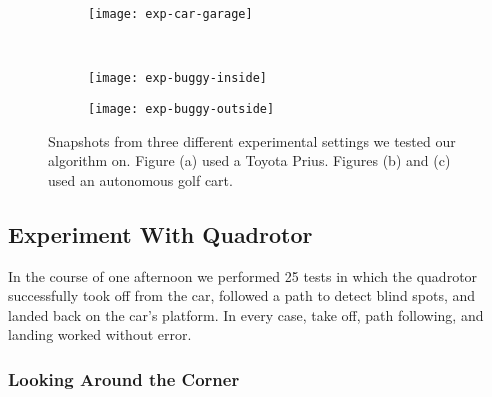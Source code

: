 \begin{figure}[t!]

    \centering

    \begin{subfigure}[t]{0.49\textwidth}

        \centering
        \texttt{[image: exp-car-garage]}
        \caption{}

        \label{fig:exp-car-garage}

    \end{subfigure}
    ~
    \begin{subfigure}[t]{0.49\textwidth}

        \centering
        \texttt{[image: exp-buggy-inside]}
        \caption{}

        \label{fig:exp-buggy-inside}

    \end{subfigure}

    \vspace*{1mm}

    \begin{subfigure}[t]{0.5\textwidth}

        \centering
        \texttt{[image: exp-buggy-outside]}
        \caption{}

        \label{fig:exp-buggy-outside}

    \end{subfigure}

    \caption{Snapshots from three different experimental settings we tested our
    algorithm on. Figure (a) used a Toyota Prius. Figures (b) and (c) used an
autonomous golf cart.}

    \label{fig:exps}

\end{figure}

\subsection{Experiment With Quadrotor}

In the course of one afternoon we performed 25 tests in which the quadrotor 
successfully took off from
the car, followed a path to detect blind spots, and landed back on the car's platform.
In every case, take off, path following, and landing worked without error.

\subsubsection{Looking Around the Corner}


